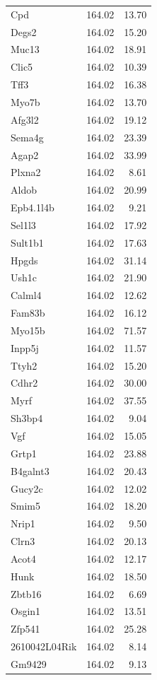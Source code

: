 \documentclass{article}
\begin{document}
\begin{longtable}{lrr}
  Cpd & 164.02 & 13.70 \\ 
  Degs2 & 164.02 & 15.20 \\ 
  Muc13 & 164.02 & 18.91 \\ 
  Clic5 & 164.02 & 10.39 \\ 
  Tff3 & 164.02 & 16.38 \\ 
  Myo7b & 164.02 & 13.70 \\ 
  Afg3l2 & 164.02 & 19.12 \\ 
  Sema4g & 164.02 & 23.39 \\ 
  Agap2 & 164.02 & 33.99 \\ 
  Plxna2 & 164.02 & 8.61 \\ 
  Aldob & 164.02 & 20.99 \\ 
  Epb4.1l4b & 164.02 & 9.21 \\ 
  Sel1l3 & 164.02 & 17.92 \\ 
  Sult1b1 & 164.02 & 17.63 \\ 
  Hpgds & 164.02 & 31.14 \\ 
  Ush1c & 164.02 & 21.90 \\ 
  Calml4 & 164.02 & 12.62 \\ 
  Fam83b & 164.02 & 16.12 \\ 
  Myo15b & 164.02 & 71.57 \\ 
  Inpp5j & 164.02 & 11.57 \\ 
  Ttyh2 & 164.02 & 15.20 \\ 
  Cdhr2 & 164.02 & 30.00 \\ 
  Myrf & 164.02 & 37.55 \\ 
  Sh3bp4 & 164.02 & 9.04 \\ 
  Vgf & 164.02 & 15.05 \\ 
  Grtp1 & 164.02 & 23.88 \\ 
  B4galnt3 & 164.02 & 20.43 \\ 
  Gucy2c & 164.02 & 12.02 \\ 
  Smim5 & 164.02 & 18.20 \\ 
  Nrip1 & 164.02 & 9.50 \\ 
  Clrn3 & 164.02 & 20.13 \\ 
  Acot4 & 164.02 & 12.17 \\ 
  Hunk & 164.02 & 18.50 \\ 
  Zbtb16 & 164.02 & 6.69 \\ 
  Osgin1 & 164.02 & 13.51 \\ 
  Zfp541 & 164.02 & 25.28 \\ 
  2610042L04Rik & 164.02 & 8.14 \\ 
  Gm9429 & 164.02 & 9.13 \\ 

\end{longtable}
\end{document}
